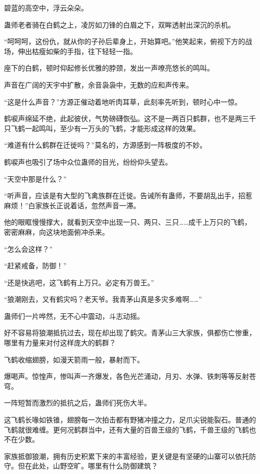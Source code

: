 
\begin{this_body}

碧蓝的高空中，浮云朵朵。

蛊师老者骑在白鹤之上，凌厉如刀锋的白眉之下，双眸透射出深沉的杀机。

“呵呵呵，这份仇，就从你的子孙后辈身上，开始算吧。”他笑起来，俯视下方的战场，伸出枯瘦如柴的手指，往下轻轻一指。

座下的白鹤，顿时仰起修长优雅的脖颈，发出一声嘹亮悠长的鸣叫。

声音在广阔的天宇中扩散，余音袅袅中，无数的应和声传来。

“这是什么声音？”方源正催动着地听肉耳草，此刻率先听到，顿时心中一惊。

鹤唳声绵延不绝，此起彼伏，气势磅礴恢弘。这不是一两百只鹤群，也不是两三千只飞鹤一起鸣叫，至少有一万头的飞鹤，才能形成这样的效果。

“难道有什么鹤群在迁徙吗？”莫名的，方源感到一阵极度的不妙。

鹤唳声也吸引了场中众位蛊师的目光，纷纷仰头望去。

“天空中那是什么？”

“听声音，应该是有大型的飞禽族群在迁徙。告诫所有蛊师，不要胡乱出手，招惹麻烦！”白家族长正说着话，忽然声音一滞。

他的眼眶慢慢撑大，就看到天空中出现一只、两只、三只……成千上万只的飞鹤，密密麻麻，向这块地面俯冲杀来。

“怎么会这样？”

“赶紧戒备，防御！”

“还是快逃吧，这飞鹤有上万只。必定有万兽王。”

“狼潮刚去，又有鹤灾吗？老天爷。我青茅山真是多灾多难啊……”

蛊师们一片哗然，无不心中震动，斗志动摇。

好不容易将狼潮抵抗过去，现在却出现了鹤灾。青茅山三大家族，俱都伤亡惨重，哪里有力量来对付这样庞大的鹤群？

飞鹤收缩翅膀，如漫天箭雨一般，暴射而下。

爆喝声。惊惶声，惨叫声一齐爆发，各色光芒涌动，月刃、水弹、铁刺等等反射苍穹。

一阵短暂而激烈的抵抗之后，蛊师们死伤大半。

这飞鹤长喙如铁锥，翅膀每一次拍击都有野猪冲撞之力，足爪尖锐能裂石。普通的飞鹤就很难缠。更何况鹤群当中，还有大量的百兽王级的飞鹤，千兽王级的飞鹤也不在少数。

家族抵御狼潮，拥有历史积累下来的丰富经验，更关键是有坚硬的山寨可以依托防守。但在此处，山野空旷。哪里有什么防御建筑？


\end{this_body}
